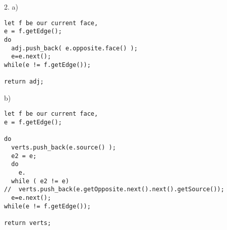 2.
a) 
\begin{verbatim}
let f be our current face,
e = f.getEdge();
do
  adj.push_back( e.opposite.face() );
  e=e.next();
while(e != f.getEdge());

return adj;
\end{verbatim}
b)
\begin{verbatim}
let f be our current face,
e = f.getEdge();

do
  verts.push_back(e.source() );
  e2 = e;
  do
    e.
  while ( e2 != e)
//  verts.push_back(e.getOpposite.next().next().getSource());
  e=e.next();
while(e != f.getEdge());

return verts;
\end{verbatim}
